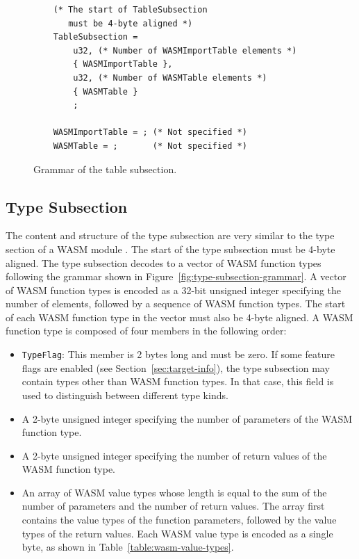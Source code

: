 \documentclass{article}
\begin{document}
\begin{figure}[H]
\begin{verbatim}
    (* The start of TableSubsection
       must be 4-byte aligned *)
    TableSubsection =
        u32, (* Number of WASMImportTable elements *)
        { WASMImportTable },
        u32, (* Number of WASMTable elements *)
        { WASMTable }
        ;

    WASMImportTable = ; (* Not specified *)
    WASMTable = ;       (* Not specified *)
\end{verbatim}
\caption{Grammar of the table subsection.}
\label{fig:table-subsection-grammar}
\end{figure}

\subsection{Type Subsection}

The content and structure of the type subsection are very similar to the type section of a WASM module \cite[Sec.~5.5.4]{webassembly2019core}.
The start of the type subsection must be 4-byte aligned.
The type subsection decodes to a vector of WASM function types following the grammar shown in Figure~\ref{fig:type-subsection-grammar}.
A vector of WASM function types is encoded as a 32-bit unsigned integer specifying the
number of elements, followed by a sequence of WASM function types.
The start of each WASM function type in the vector must also be 4-byte aligned.
A WASM function type is composed of four members in the following order:
\begin{itemize}
    \item \verb|TypeFlag|: This member is 2 bytes long and must be zero.
        If some feature flags are enabled (see Section~\ref{sec:target-info}), the type subsection may contain types other than WASM function types.
        In that case, this field is used to distinguish between different type kinds.
    \item A 2-byte unsigned integer specifying the number of parameters of the WASM function type.
    \item A 2-byte unsigned integer specifying the number of return values of the WASM function type.
    \item An array of WASM value types whose length is equal to the sum of the number of parameters and the number of return values.
        The array first contains the value types of the function parameters, followed by the value types of the return values.
        Each WASM value type is encoded as a single byte, as shown in Table~\ref{table:wasm-value-types}.
\end{itemize}
\end{document}
